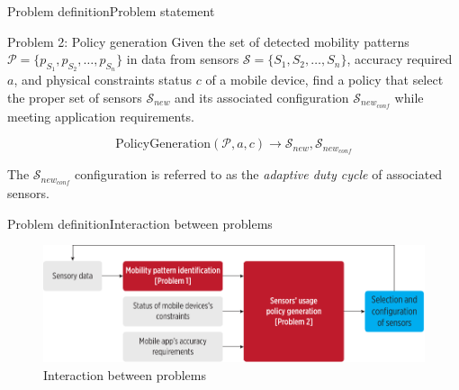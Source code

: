 \documentclass[9pt,xcolor={dvipsnames},handout]{beamer}
\begin{document}
\begin{frame}{Problem definition}{Problem statement}
\begin{alertblock}{Problem 2: Policy generation}
Given the set of detected mobility patterns $\mathcal{P} = \{ p_{S_1}, p_{S_2}, \ldots, p_{S_n} \}$ in data from sensors $\mathcal{S} = \{ S_1,S_2,\ldots, S_n \}$, accuracy required $a$, and physical constraints status $c$ of a mobile device, find a policy that select the proper set of sensors $\mathcal{S}_{new}$ and its associated configuration $\mathcal{S}_{new_{conf}}$  while meeting application requirements.

\begin{equation}
  \text{PolicyGeneration}( \mathcal{P}, a, c ) \longrightarrow{} \mathcal{S}_{new}, \mathcal{S}_{new_{conf}}
\end{equation}

The $\mathcal{S}_{new_{conf}}$ configuration is referred to as the \emph{adaptive duty cycle} of associated sensors.
\end{alertblock}
\end{frame}

\begin{frame}{Problem definition}{Interaction between problems}
\begin{figure}[tb]
  \centering
  \includegraphics[width=\textwidth]{../../../resources/images/vectors/problems-incorporation}
  \caption{Interaction between problems}
  \label{fig:problems-incorporation}
\end{figure}
\end{frame}
\end{document}
